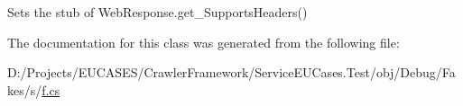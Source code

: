 Sets the stub of Web\-Response.\-get\-\_\-\-Supports\-Headers()



The documentation for this class was generated from the following file\-:\begin{DoxyCompactItemize}
\item 
D\-:/\-Projects/\-E\-U\-C\-A\-S\-E\-S/\-Crawler\-Framework/\-Service\-E\-U\-Cases.\-Test/obj/\-Debug/\-Fakes/s/\hyperlink{s_2f_8cs}{f.\-cs}\end{DoxyCompactItemize}

